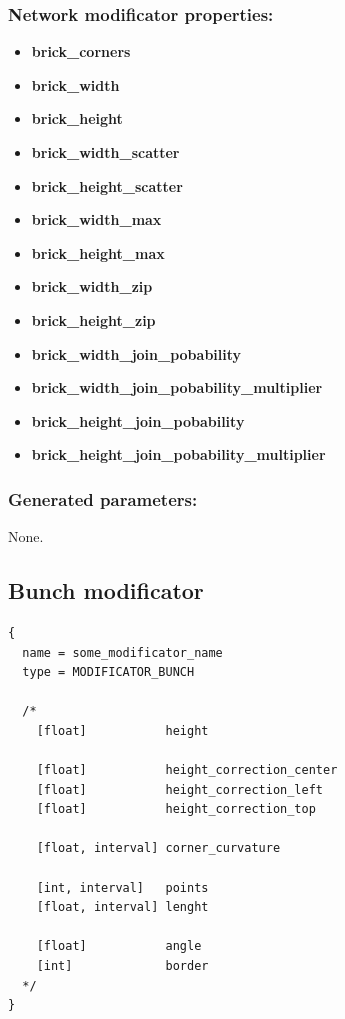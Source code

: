 \documentclass[9pt]{article}
\begin{document}
\subsubsection*{Network modificator properties:}
\begin{itemize}
\item{\bf brick\_corners}
\item{\bf brick\_width}
\item{\bf brick\_height}
\item{\bf brick\_width\_scatter}
\item{\bf brick\_height\_scatter}
\item{\bf brick\_width\_max}
\item{\bf brick\_height\_max}
\item{\bf brick\_width\_zip}
\item{\bf brick\_height\_zip}
\item{\bf brick\_width\_join\_pobability}
\item{\bf brick\_width\_join\_pobability\_multiplier}
\item{\bf brick\_height\_join\_pobability}
\item{\bf brick\_height\_join\_pobability\_multiplier}
\end{itemize}

\subsubsection*{Generated parameters:}

None.

\subsection{Bunch modificator}

\begin{verbatim}
{
  name = some_modificator_name
  type = MODIFICATOR_BUNCH

  /*
    [float]           height
    
    [float]           height_correction_center
    [float]           height_correction_left
    [float]           height_correction_top      
    
    [float, interval] corner_curvature
    
    [int, interval]   points
    [float, interval] lenght
    
    [float]           angle
    [int]             border
  */
}
\end{verbatim}
\end{document}
